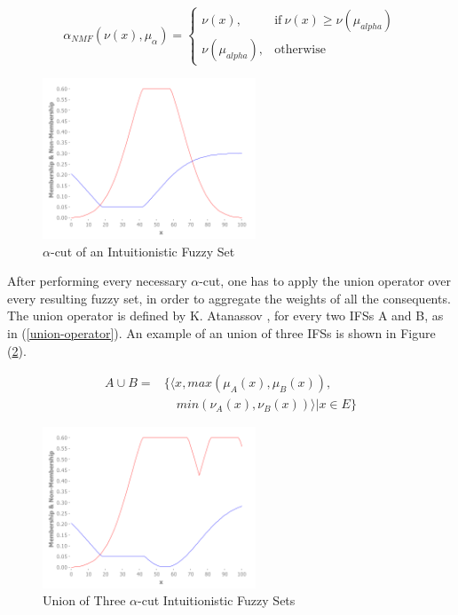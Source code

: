 \documentclass[conference]{IEEEtran}
\begin{document}
\begin{equation}
  \label{nmf-alpha-cut}
  \alpha_{NMF}(\nu (x),\mu_{\alpha}) =
  \begin{cases}
    \nu (x), & \text{if}\ \nu (x) \geq \nu (\mu_{alpha})  \\
    \nu (\mu_{alpha}), & \text{otherwise}
  \end{cases}
\end{equation}

\begin{figure}[!t]
  \centering
  \includegraphics[width=2.5in]{alpha-cut}
  \caption{$\alpha$-cut of an Intuitionistic Fuzzy Set}
  \label{alpha-cut-example}
\end{figure}

After performing every necessary $\alpha$-cut, one has to apply the
union operator over every resulting fuzzy set, in order to aggregate
the weights of all the consequents. The union operator is defined by
K. Atanassov \cite{atanassov2013intuitionistic}, for every two IFSs A
and B, as in (\ref{union-operator}). An example of an union of three
IFSs is shown in Figure (\ref{ifs-union}).

\begin{equation}
  \label{union-operator}
  \begin{aligned}
    A \cup B  = &\{ \langle x, max(\mu_{A} (x), \mu_{B} (x)),\\
    &\quad min(\nu_{A} (x), \nu_{B} (x)) \rangle | x \in E \}
\end{aligned}
\end{equation}

\begin{figure}[!t]
  \centering
  \includegraphics[width=2.5in]{ifs-union}
  \caption{Union of Three $\alpha$-cut Intuitionistic Fuzzy Sets}
  \label{ifs-union}
\end{figure}
\end{document}
